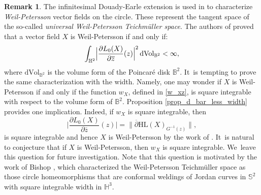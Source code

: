 \documentclass[JEP,XML,SOM,Unicode,NoEqCountersInSection, NoFloatCountersInSection,published]{cedram}
\theoremstyle{plain}
\theoremstyle{definition}
\newtheorem{remark}[cor]{Remark}
\begin{document}
\begin{remark}\label{remark_weil_petersson}
The infinitesimal Douady-Earle extension is used in \cite{integral_operator_Zygmund} to characterize \emph{Weil-Petersson} vector fields on the circle. These represent the tangent space of the so-called \emph{universal Weil-Petersson Teichmüller space}. The authors of \cite{integral_operator_Zygmund} proved that a vector field $X$ is Weil-Petersson if and only if:
\[ \int_{\mathbb{H}^2} \Bigl|\frac{\partial L_0(X)}{\partial \overline{z}}(z)\Bigr| ^2 \, \mathrm{d}\mathrm{Vol}_{\mathbb{B}^2} <\infty,\] where $\mathrm{d}\mathrm{Vol}_{\mathbb{B}^2} $ is the volume form of the Poincaré disk $\mathbb{B}^2$. It~is tempting to prove the same characterization with the width. Namely, one may wonder if $X$ is Weil-Petersson if and only if the function $w_X$, defined in \eqref{w_xz}, is square integrable with respect to the volume form of $\mathbb{B}^2$. Proposition \ref{prop_d_bar_less_width} provides one implication. Indeed, if $w_X$ is square integrable, then
\[
\biggl|\frac{\partial L_0(X)}{\partial \overline{z}}(z)\biggr| =\rVert\overline{\partial}\mathrm{HL}(X)_{G^{-1}(z)}\lVert,
\]
is square integrable and hence $X$ is Weil-Petersson by the work of \cite{integral_operator_Zygmund}. It~is natural to conjecture that if $X$ is Weil-Petersson, then $w_X$ is square integrable. We~leave this question for future investigation. Note that this question is motivated by the work of Bishop \cite{bishop}, which characterized the Weil-Petersson Teichmüller space as those circle homeomorphisms that are conformal weldings of Jordan curves in $\mathbb{S}^2$ with square integrable width in $\mathbb{H}^3$.
\end{remark}

\backmatter


\end{document}
